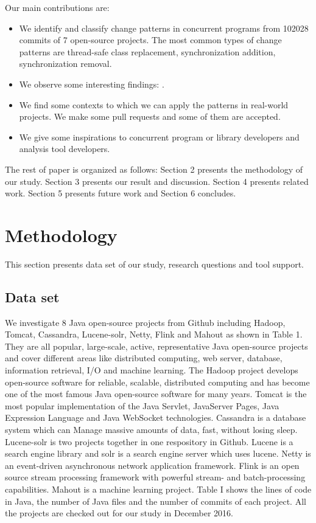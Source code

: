 \documentclass[conference]{IEEEtran}
\begin{document}
Our main contributions are:

\begin{itemize}
	\item We identify and classify change patterns in concurrent programs from 102028 commits of 7 open-source projects. The most common types of change patterns are thread-safe class replacement, synchronization addition, synchronization removal.
	\item We observe some interesting findings: .
	\item We find some contexts to which we can apply the patterns in real-world projects. We make some pull requests and some of them are accepted.
	\item We give some inspirations to concurrent program or library developers and analysis tool developers.
\end{itemize}

The rest of paper is organized as follows: Section 2 presents the methodology of our study. Section 3 presents our result and discussion. Section 4 presents related work. Section 5 presents future work and Section 6 concludes.

\section{Methodology}
This section presents data set of our study, research questions and tool support.

\subsection{Data set} We investigate 8 Java open-source projects from Github including Hadoop, Tomcat, Cassandra, Lucene-solr, Netty, Flink and Mahout as shown in Table 1. They are all popular, large-scale, active, representative Java open-source projects and cover different areas like distributed computing, web server, database, information retrieval, I/O and machine learning. The Hadoop project develops open-source software for reliable, scalable, distributed computing and has become one of the most famous Java open-source software for many years. Tomcat is the most popular implementation of the Java Servlet, JavaServer Pages, Java Expression Language and Java WebSocket technologies. Cassandra \cite{journals/sigops/LakshmanM10} is a database system which can Manage massive amounts of data, fast, without losing sleep. Lucene-solr is two projects together in one respository in Github. Lucene is a search engine library and solr is a search engine server which uses lucene. Netty is an event-driven asynchronous network application framework. Flink is an open source stream processing framework with powerful stream- and batch-processing capabilities. Mahout is a machine learning project. Table I shows the lines of code in Java, the number of Java files and the number of commits of each project. All the projects are checked out for our study in December 2016.
\end{document}
